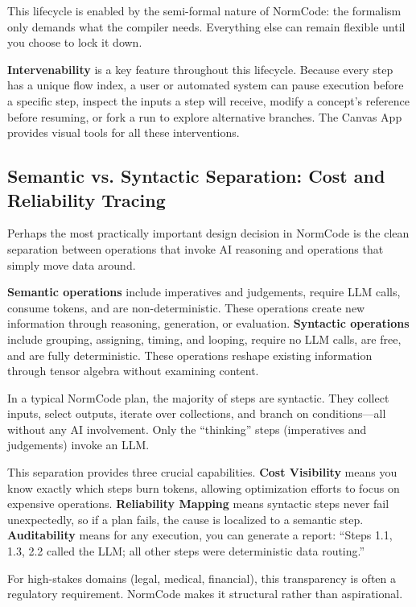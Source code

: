 This lifecycle is enabled by the semi-formal nature of NormCode: the formalism only demands what the compiler needs. Everything else can remain flexible until you choose to lock it down.

\textbf{Intervenability} is a key feature throughout this lifecycle. Because every step has a unique flow index, a user or automated system can pause execution before a specific step, inspect the inputs a step will receive, modify a concept's reference before resuming, or fork a run to explore alternative branches. The Canvas App provides visual tools for all these interventions.

\subsection{Semantic vs. Syntactic Separation: Cost and Reliability Tracing}

Perhaps the most practically important design decision in NormCode is the clean separation between operations that invoke AI reasoning and operations that simply move data around.

\textbf{Semantic operations} include imperatives and judgements, require LLM calls, consume tokens, and are non-deterministic. These operations create new information through reasoning, generation, or evaluation. \textbf{Syntactic operations} include grouping, assigning, timing, and looping, require no LLM calls, are free, and are fully deterministic. These operations reshape existing information through tensor algebra without examining content.

In a typical NormCode plan, the majority of steps are syntactic. They collect inputs, select outputs, iterate over collections, and branch on conditions---all without any AI involvement. Only the ``thinking'' steps (imperatives and judgements) invoke an LLM.

This separation provides three crucial capabilities. \textbf{Cost Visibility} means you know exactly which steps burn tokens, allowing optimization efforts to focus on expensive operations. \textbf{Reliability Mapping} means syntactic steps never fail unexpectedly, so if a plan fails, the cause is localized to a semantic step. \textbf{Auditability} means for any execution, you can generate a report: ``Steps 1.1, 1.3, 2.2 called the LLM; all other steps were deterministic data routing.''

For high-stakes domains (legal, medical, financial), this transparency is often a regulatory requirement. NormCode makes it structural rather than aspirational.

